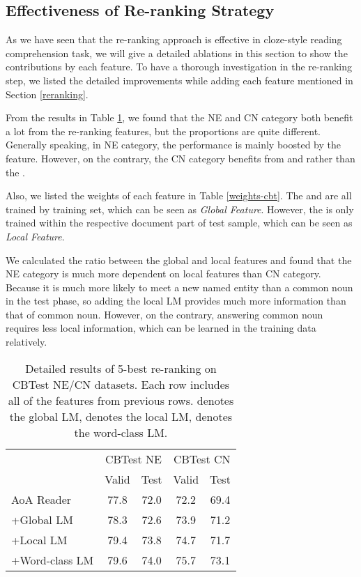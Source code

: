 \documentclass[11pt,a4paper]{article}
\begin{document}
\subsection{Effectiveness of Re-ranking Strategy}        

As we have seen that the re-ranking approach is effective in cloze-style reading comprehension task, we will give a detailed ablations in this section to show the contributions by each feature.
To have a thorough investigation in the re-ranking step, we listed the detailed improvements while adding each feature mentioned in Section \ref{reranking}. 

From the results in Table \ref{rerank-cbt}, we found that the NE and CN category both benefit a lot from the re-ranking features, but the proportions are quite different.
Generally speaking, in NE category, the performance is mainly boosted by the  feature.
However, on the contrary, the CN category benefits from  and  rather than the .
           
Also, we listed the weights of each feature in Table \ref{weights-cbt}. The  and  are all trained by training set, which can be seen as {\em Global Feature}. However, the  is only trained within the respective document part of test sample, which can be seen as {\em Local Feature}. 


We calculated the ratio between the global and local features and found that the NE category is much more dependent on local features than CN category. Because it is much more likely to meet a new named entity than a common noun in the test phase, so adding the local LM provides much more information than that of common noun. However, on the contrary, answering common noun requires less local information, which can be learned in the training data relatively.

        \begin{table}[tp]
        \begin{center}
        \begin{tabular}{lcccc}
        \toprule
        & \multicolumn{2}{p{1.8cm}}{\centering CBTest NE} & \multicolumn{2}{p{1.8cm}}{\centering CBTest CN}\\
        & Valid & Test & Valid & Test\\
        \midrule
        AoA Reader & 77.8 & 72.0 & 72.2 & 69.4 \\
        +Global LM& 78.3 & 72.6 & 73.9 & 71.2 \\
        +Local LM& 79.4 & 73.8 & 74.7 & 71.7 \\
        +Word-class LM& 79.6 & 74.0 & 75.7 & 73.1 \\
        \bottomrule
        \end{tabular}
        \end{center}
        \caption{\label{rerank-cbt} Detailed results of 5-best re-ranking on CBTest NE/CN datasets. Each row includes all of the features from previous rows.  denotes the global LM,  denotes the local LM,  denotes the word-class LM.
         }
        \end{table}
        
\end{document}
